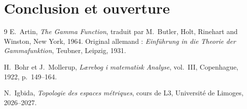 \documentclass[11pt,a4paper]{amsart}
\theoremstyle{plain}
\theoremstyle{definition}
\theoremstyle{remark}
\numberwithin{equation}{section}
\begin{document}
\section{Conclusion et ouverture}

\begin{thebibliography}{9}
E.~Artin, \emph{The Gamma Function}, traduit par M.~Butler, Holt, Rinehart
and Winston, New York, 1964. Original allemand :
\emph{Einführung in die Theorie der Gammafunktion}, Teubner, Leipzig, 1931.

H.~Bohr et J.~Mollerup, \emph{Lærebog i matematisk Analyse}, vol.~III,
Copenhague, 1922, p.~149--164.

N.~Igbida, \emph{Topologie des espaces métriques}, cours de L3,
Université de Limoges, 2026--2027.
\end{thebibliography}
\end{document}
